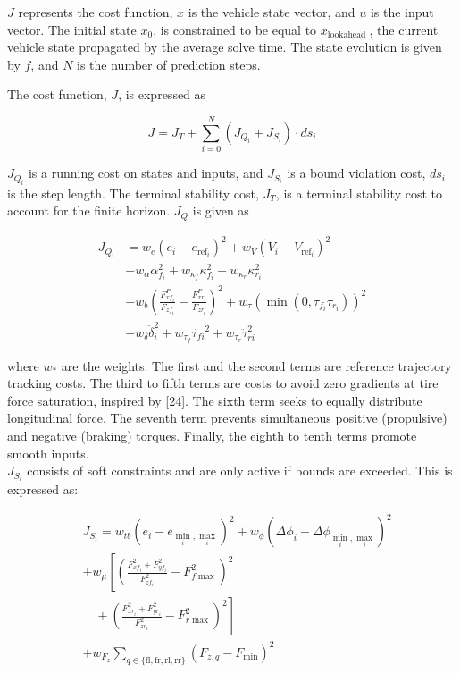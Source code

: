 \documentclass[10pt]{article}
\begin{document}
$J$ represents the cost function, $x$ is the vehicle state vector, and $u$ is the input vector. The initial state $x_{0}$, is constrained to be equal to $x_{\text {lookahead }}$, the current vehicle state propagated by the average solve time. The state evolution is given by $f$, and $N$ is the number of prediction steps.

The cost function, $J$, is expressed as


\begin{equation*}
J=J_{T}+\sum_{i=0}^{N}\left(J_{Q_{i}}+J_{S_{i}}\right) \cdot d s_{i} \tag{16}
\end{equation*}


$J_{Q_{i}}$ is a running cost on states and inputs, and $J_{S_{i}}$ is a bound violation cost, $d s_{i}$ is the step length. The terminal stability cost, $J_{T}$, is a terminal stability cost to account for the finite horizon. $J_{Q}$ is given as


\begin{align*}
J_{Q_{i}} & =w_{e}\left(e_{i}-e_{\mathrm{ref}_{i}}\right)^{2}+w_{V}\left(V_{i}-V_{\mathrm{ref}_{i}}\right)^{2} \\
& +w_{\alpha} \alpha_{f_{i}}^{2}+w_{\kappa_{f}} \kappa_{f_{i}}^{2}+w_{\kappa_{r}} \kappa_{r_{i}}^{2} \\
& +w_{b}\left(\frac{F_{x f_{i}}^{P}}{F_{z f_{i}}}-\frac{F_{x r_{i}}^{P}}{F_{z r_{i}}}\right)^{2}+w_{\tau}\left(\min \left(0, \tau_{f_{i}} \tau_{r_{i}}\right)\right)^{2}  \tag{17}\\
& +w_{\delta} \ddot{\delta}_{i}^{2}+w_{\tau_{f}}{\ddot{\tau_{f i}}}^{2}+w_{\tau_{r}} \ddot{\tau}_{r i}^{2}
\end{align*}


where $w_{*}$ are the weights. The first and the second terms are reference trajectory tracking costs. The third to fifth terms are costs to avoid zero gradients at tire force saturation, inspired by [24]. The sixth term seeks to equally distribute longitudinal force. The seventh term prevents simultaneous positive (propulsive) and negative (braking) torques. Finally, the eighth to tenth terms promote smooth inputs.\\
$J_{S_{i}}$ consists of soft constraints and are only active if bounds are exceeded. This is expressed as:


\begin{align*}
& J_{S_{i}}=w_{t b}\left(e_{i}-e_{\min _{i}, \max _{i}}\right)^{2}+w_{\phi}\left(\Delta \phi_{i}-\Delta \phi_{\min _{i}, \max _{i}}\right)^{2} \\
& +w_{\mu}\left[\left(\frac{F_{x f_{i}}^{2}+F_{y f_{i}}^{2}}{F_{z f_{i}}^{2}}-F_{f \max }^{2}\right)^{2}\right. \\
& \left.\quad+\left(\frac{F_{x r_{i}}^{2}+F_{y r_{i}}^{2}}{F_{z r_{i}}^{2}}-F_{r \max }^{2}\right)^{2}\right] \\
& +w_{F_{z}} \sum_{q \in\{\mathrm{fl}, \mathrm{fr}, \mathrm{rl}, \mathrm{rr}\}}\left(F_{z, q}-F_{\min }\right)^{2} \tag{18}
\end{align*}
\end{document}
